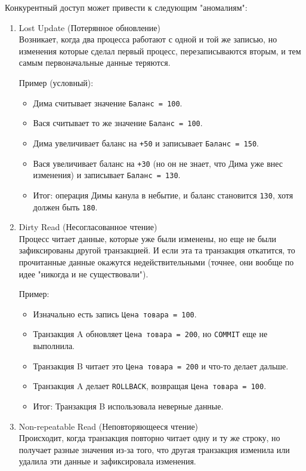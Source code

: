 Конкурентный доступ может привести к следующим "аномалиям":
\begin{enumerate}
    \item Lost Update (Потерянное обновление) ~\\
    Возникает, когда два процесса работают с одной и той же записью, но изменения которые сделал первый процесс, перезаписываются вторым, и тем самым первоначальные данные теряются.
    
    Пример (условный):
    \begin{itemize}
        \item Дима считывает значение \texttt{Баланс = 100}.
        \item Вася считывает то же значение \texttt{Баланс = 100}.
        \item Дима увеличивает баланс на \texttt{+50} и записывает \texttt{Баланс = 150}.
        \item Вася увеличивает баланс на \texttt{+30} (но он не знает, что Дима уже внес изменения) и записывает \texttt{Баланс = 130}.
        \item Итог: операция Димы канула в небытие, и баланс становится \texttt{130}, хотя должен быть \texttt{180}.
    \end{itemize}

    \item Dirty Read (Несогласованное чтение) ~\\
    Процесс читает данные, которые уже были изменены, но еще не были зафиксированы другой транзакцией. И если эта та транзакция откатится, то прочитанные данные окажутся недействительными (точнее, они вообще по идее "никогда и не существовали").
    
    Пример:
    \begin{itemize}
        \item Изначально есть запись \texttt{Цена товара = 100}.
        \item Транзакция A обновляет \texttt{Цена товара = 200}, но \texttt{COMMIT} еще не выполнила.
        \item Транзакция B читает это \texttt{Цена товара = 200} и что-то делает дальше.
        \item Транзакция A делает \texttt{ROLLBACK}, возвращая \texttt{Цена товара = 100}.
        \item Итог: Транзакция B использовала неверные данные.
    \end{itemize}

    \item Non-repeatable Read (Неповторяющееся чтение) ~\\
    Происходит, когда транзакция повторно читает одну и ту же строку, но получает разные значения из-за того, что другая транзакция изменила или удалила эти данные и зафиксировала изменения.


\end{enumerate}
